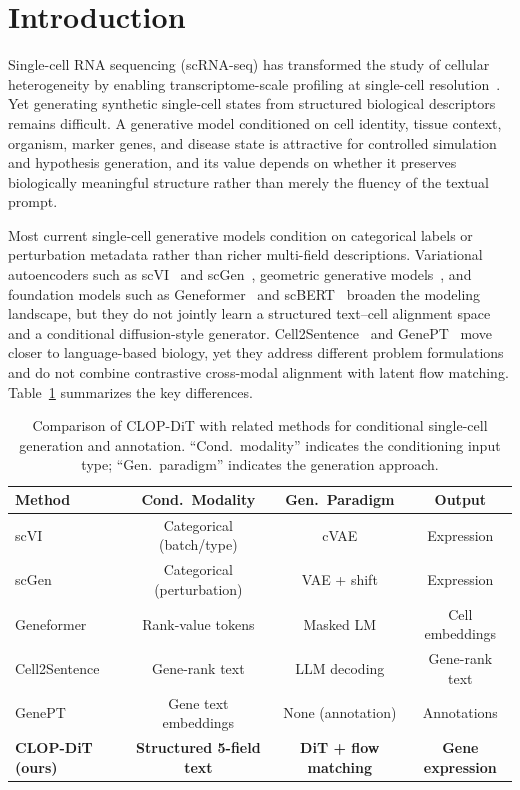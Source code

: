 \documentclass[biology,article,submit,pdftex,moreauthors]{Definitions/mdpi}
\begin{document}
\section{Introduction}

Single-cell RNA sequencing (scRNA-seq) has transformed the study of cellular heterogeneity by enabling transcriptome-scale profiling at single-cell resolution~\cite{ref-scrnaseq-review,ref-10x}. Yet generating synthetic single-cell states from structured biological descriptors remains difficult. A generative model conditioned on cell identity, tissue context, organism, marker genes, and disease state is attractive for controlled simulation and hypothesis generation, and its value depends on whether it preserves biologically meaningful structure rather than merely the fluency of the textual prompt.

Most current single-cell generative models condition on categorical labels or perturbation metadata rather than richer multi-field descriptions. Variational autoencoders such as scVI~\cite{ref-scvi,ref-scvi-tools} and scGen~\cite{ref-scgen}, geometric generative models~\cite{ref-scdiff}, and foundation models such as Geneformer~\cite{ref-geneformer} and scBERT~\cite{ref-scbert,ref-scfoundation,ref-cellplm,ref-uce} broaden the modeling landscape, but they do not jointly learn a structured text--cell alignment space and a conditional diffusion-style generator. Cell2Sentence~\cite{ref-cell2sentence} and GenePT~\cite{ref-genept} move closer to language-based biology, yet they address different problem formulations and do not combine contrastive cross-modal alignment with latent flow matching. Table~\ref{tab:method-comparison} summarizes the key differences.

\begin{table}[!htbp]
\caption{Comparison of CLOP-DiT with related methods for conditional single-cell generation and annotation. ``Cond.\ modality'' indicates the conditioning input type; ``Gen.\ paradigm'' indicates the generation approach.\label{tab:method-comparison}}
\centering
\small
\begin{tabular}{lccc}
\toprule
\textbf{Method} & \textbf{Cond.\ Modality} & \textbf{Gen.\ Paradigm} & \textbf{Output} \\
\midrule
scVI~\cite{ref-scvi}           & Categorical (batch/type) & cVAE               & Expression \\
scGen~\cite{ref-scgen}         & Categorical (perturbation) & VAE + shift       & Expression \\
Geneformer~\cite{ref-geneformer} & Rank-value tokens & Masked LM           & Cell embeddings \\
Cell2Sentence~\cite{ref-cell2sentence} & Gene-rank text   & LLM decoding        & Gene-rank text \\
GenePT~\cite{ref-genept}       & Gene text embeddings     & None (annotation)   & Annotations \\
\textbf{CLOP-DiT (ours)}       & \textbf{Structured 5-field text} & \textbf{DiT + flow matching} & \textbf{Gene expression} \\
\bottomrule
\end{tabular}
\end{table}
\end{document}
